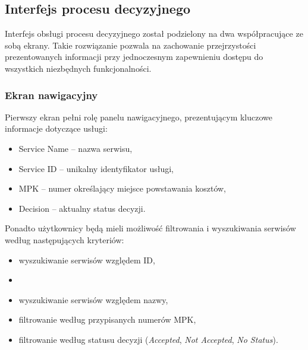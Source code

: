 \subsection{Interfejs procesu decyzyjnego}
Interfejs obsługi procesu decyzyjnego został podzielony na dwa współpracujące ze sobą ekrany. Takie rozwiązanie pozwala na zachowanie przejrzystości prezentowanych informacji przy jednoczesnym zapewnieniu dostępu do wszystkich niezbędnych funkcjonalności.

\subsubsection{Ekran nawigacyjny}
Pierwszy ekran pełni rolę panelu nawigacyjnego, prezentującym kluczowe informacje dotyczące usługi:
\begin{itemize}
    \item Service Name -- nazwa serwisu,
    \item Service ID -- unikalny identyfikator usługi,
    \item MPK -- numer określający miejsce powstawania kosztów,
    \item Decision -- aktualny status decyzji.
\end{itemize}
Ponadto użytkownicy będą mieli możliwość filtrowania i wyszukiwania serwisów według następujących kryteriów:
\begin{itemize}
    \item wyszukiwanie serwisów względem ID,
    \item \item wyszukiwanie serwisów względem nazwy,
    \item filtrowanie według przypisanych numerów MPK,
    \item filtrowanie według statusu decyzji (\emph{Accepted}, \emph{Not Accepted}, \emph{No Status}).
\end{itemize}

